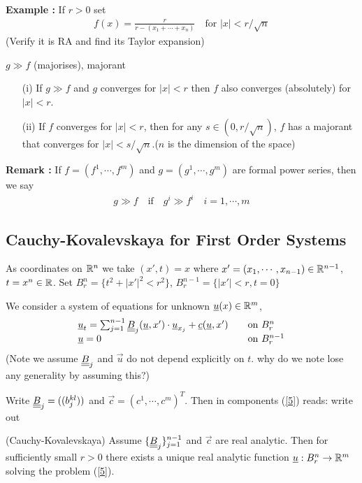 \documentclass[10pt,a4paper]{report}
\begin{document}
\textbf{Example :} If $r>0$ set
\begin{align*}
f(x) = \frac{r}{r-(x_1 + \cdots + x_n)} \quad \text{for } |x|<r/\sqrt{n}
\end{align*}
(Verify it is RA and find its Taylor expansion)
\s

 $g\gg f$ (majorises), majorant 
\s

\lem \begin{itemize}
\item[(i)] If $g\gg f$ and $g$ converges for $|x|<r$ then $f$ also converges (absolutely) for $|x| <r$.
\item[(ii)] If $f$ converges for $|x|<r$, then for any $s\in (0,r/\sqrt{n})$, $f$ has a majorant that converges for $|x|<s/\sqrt{n}$.($n$ is the dimension of the space)
\end{itemize}
\s

\textbf{Remark :} If $f = (f^1, \cdots, f^m)$ and $g =(g^1, \cdots, g^m)$ are formal power series, then we say
\begin{align*}
g\gg f \quad \text{if} \quad g^i \gg f^i \quad i=1,\cdots,m
\end{align*}
\s

\subsection*{Cauchy-Kovalevskaya for First Order Systems}

As coordinates on $\mathbb{R}^n$ we take $(x',t) = x$ where $x'=(x_1,\cdots,x_{n-1}) \in \mathbb{R}^{n-1}$, $t=x^n \in \mathbb{R}$. Set $B^n_r = \{t^2 +|x'|^2 <r^2 \}$, $B_r^{n-1} = \{|x'|<r, t=0 \}$
\s

We consider a system of equations for unknown $\underline{u}(x) \in \mathbb{R}^m$,
\begin{align}
\begin{array}{ll}
\underline{u}_t = \sum_{j=1}^{n-1} \underline{\underline{B}}_j (\underline{u},x') \cdot \underline{u}_{x_j} + \underline{c}(\underline{u},x') \quad & \text{on } B_r^n  \\
\underline{u} = 0 \quad & \text{on } B_r^{n-1} 
\end{array} \label{5}
\end{align}
(Note we assume $\underline{\underline{B}}_j$ and $\vec{u}$ do not depend explicitly on $t$. why do we note lose any generality by assuming this?)

\quad Write $\underline{\underline{B}}_j = ((b_j^{kl}))$ and $\vec{c}  = (c^1, \cdots, c^m)^T$. Then in components (\ref{5}) reads: write out
\s

\thm (Cauchy-Kovalevskaya) Assume $\{\underline{\underline{B}}_j \}_{j=1}^{n-1}$ and $\vec{c}$ are real analytic. Then for sufficiently small $r>0$ there exists a unique real analytic function $\underline{u} : B_r^n \rightarrow \mathbb{R}^m$ solving the problem (\ref{5}).
\s
\end{document}
